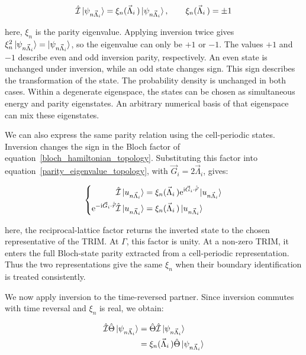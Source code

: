 \begin{equation}
    \hat{\mathcal{I}}\ket{\psi_{n\vec{\Lambda}_i}}
    =\xi_n(\vec{\Lambda}_i\,)\ket{\psi_{n\vec{\Lambda}_i}},
    \qquad \xi_n(\vec{\Lambda}_i\,)=\pm1
\label{parity_eigenvalue_topology}
\end{equation}

here, $\xi_n$ is the parity eigenvalue.
Applying inversion twice gives $\xi_n^2\ket{\psi_{n\vec{\Lambda}_i}}=\ket{\psi_{n\vec{\Lambda}_i}}$,
so the eigenvalue can only be $+1$ or $-1$.
The values $+1$ and $-1$ describe even and odd inversion parity, respectively.
An even state is unchanged under inversion, while an odd state changes sign.
This sign describes the transformation of the state.
The probability density is unchanged in both cases.
Within a degenerate eigenspace, the states can be chosen as simultaneous energy and parity eigenstates.
An arbitrary numerical basis of that eigenspace can mix these eigenstates.

We can also express the same parity relation using the cell-periodic states.
Inversion changes the sign in the Bloch factor of equation~\eqref{bloch_hamiltonian_topology}.
Substituting this factor into equation~\eqref{parity_eigenvalue_topology}, with $\vec{G}_i=2\vec{\Lambda}_i$, gives:

\begin{equation}
\left\{\begin{aligned}
    \hat{\mathcal{I}}\ket{u_{n\vec{\Lambda}_i}}
    &=\xi_n(\vec{\Lambda}_i\,)
    \mathrm{e}^{\mathrm{i}\vec{G}_i\cdot\hat{\vec{r}}}\ket{u_{n\vec{\Lambda}_i}} \\
    \mathrm{e}^{-\mathrm{i}\vec{G}_i\cdot\hat{\vec{r}}}
    \hat{\mathcal{I}}\ket{u_{n\vec{\Lambda}_i}}
    &=\xi_n(\vec{\Lambda}_i\,)\ket{u_{n\vec{\Lambda}_i}}
\end{aligned}\right.
\label{cell_periodic_parity_topology}
\end{equation}

here, the reciprocal-lattice factor returns the inverted state to the chosen representative of the TRIM.
At $\Gamma$, this factor is unity.
At a non-zero TRIM, it enters the full Bloch-state parity extracted from a cell-periodic representation.
Thus the two representations give the same $\xi_n$ when their boundary identification is treated consistently.

We now apply inversion to the time-reversed partner.
Since inversion commutes with time reversal and $\xi_n$ is real, we obtain:

\begin{equation}
\begin{aligned}
    \hat{\mathcal{I}}\hat{\Theta}\ket{\psi_{n\vec{\Lambda}_i}}
    &=\hat{\Theta}\hat{\mathcal{I}}\ket{\psi_{n\vec{\Lambda}_i}} \\
    &=\xi_n(\vec{\Lambda}_i\,)
    \hat{\Theta}\ket{\psi_{n\vec{\Lambda}_i}}
\end{aligned}
\label{equal_parity_kramers_pair_topology}
\end{equation}

